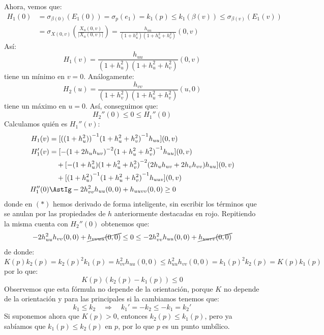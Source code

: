 \noindent
Ahora, vemos que:
\begin{align*}
    H_1(0) &= \sigma_{\beta(0)}(E_1(0)) = \sigma_p(e_1) = k_1(p) \leq k_1(\beta(v)) \leq \sigma_{\beta(v)}(E_1(v)) \\ 
           &= \sigma_{X(0,v)}\left(\frac{X_u(0,v)}{|X_u(0,v)|}\right) = \frac{h_{uu}}{(1+h_u^2)(1+ h_u^2 + h_v^2)}(0,v)
\end{align*}
Así:
\begin{equation*}
    H_1(v) = \frac{h_{uu}}{(1+h_u^2)(1+h_u^2+h_v^2)}(0,v) 
\end{equation*}
tiene un mínimo en $v=0$. Análogamente:
\begin{equation*}
    H_2(u) = \frac{h_{vv}}{(1+h_v^2)(1+h_u^2+h_v^2)}(u,0)
\end{equation*}
tiene un máximo en $u=0$. Así, conseguimos que:
\begin{equation*}
    H_2''(0) \leq 0 \leq H_1''(0)
\end{equation*}
Calculamos quién es $H_1''(v)$:
\begin{align*}
    H_1(v) &= [{((1+h_u^2))}^{-1}{(1+h_u^2+h_v^2)}^{-1}h_{uu}](0,v) \\
    H_1'(v) &= [-{(1+2h_uh_{uv})}^{-2}{(1+h_u^2+h_v^2)}^{-1}h_{uu}](0,v)  \\
            &\quad + [-(1+h_u^2){(1+h_u^2+h_v^2)}^{-2}(2h_uh_{uv}+2h_vh_{vv})h_{uu}](0,v) \\
            &\quad + [{(1+h_u^2)}^{-1}{(1+h_u^2+h_v^2)}^{-1}h_{uuv}](0,v) \\
    H_1''(0) &\AstIg -2h_{vv}^2h_{uu}(0,0) + h_{uuvv}(0,0) \geq 0
\end{align*}
donde en $(\ast)$ hemos derivado de forma inteligente, sin escribir los términos que se anulan por las propiedades de $h$ anteriormente destacadas en rojo. Repitiendo la misma cuenta con $H_2''(0)$ obtenemos que:
\begin{equation*}
    -2h_{uu}^2h_{vv}(0,0) + \cancel{h_{vvuu}(0,0)} \leq 0 \leq -2h_{vv}^2h_{uu}(0,0) + \cancel{h_{uuvv}(0,0)}
\end{equation*}
de donde:
\begin{equation*}
     K(p)k_2(p) = k_2(p)^2k_1(p) = h_{vv}^2h_{uu}(0,0) \leq h_{uu}^2h_{vv}(0,0) = k_1(p)^2k_2(p) = K(p)k_1(p)
\end{equation*}
por lo que:
\begin{equation*}
    \boxed{K(p)(k_2(p)-k_1(p)) \leq 0}
\end{equation*}
Observemos que esta fórmula no depende de la orientación, porque $K$ no depende de la orientación y para las principales si la cambiamos tenemos que:
\begin{equation*}
    k_1\leq k_2 \quad\Longrightarrow\quad k_1' = -k_2\leq -k_1 = k_2'
\end{equation*}
Si suponemos ahora que $K(p)>0$, entonces $k_2(p)\leq k_1(p)$, pero ya sabíamos que $k_1(p)\leq k_2(p)$ en $p$, por lo que $p$ es un punto umbílico.


